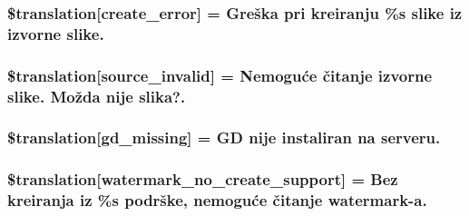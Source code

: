 \subsubsection[{\$translation}]{\setlength{\rightskip}{0pt plus 5cm}\$translation\mbox{[}\textquotesingle{}create\+\_\+error\textquotesingle{}\mbox{]} = \textquotesingle{}Greška pri kreiranju \%s slike iz izvorne slike.\textquotesingle{}}\label{class_8upload_8hr___h_r_8php_a53013ce9255c4e1849098ddd9fdb2b3f}
\hypertarget{class_8upload_8hr___h_r_8php_a6ab0a660b457eaf2d3434b225449fdd6}{}
\subsubsection[{\$translation}]{\setlength{\rightskip}{0pt plus 5cm}\$translation\mbox{[}\textquotesingle{}source\+\_\+invalid\textquotesingle{}\mbox{]} = \textquotesingle{}Nemoguće čitanje izvorne slike. Možda nije slika?.\textquotesingle{}}\label{class_8upload_8hr___h_r_8php_a6ab0a660b457eaf2d3434b225449fdd6}
\hypertarget{class_8upload_8hr___h_r_8php_a7f3dfcc0db4bbc0f2e7210c439798e56}{}
\subsubsection[{\$translation}]{\setlength{\rightskip}{0pt plus 5cm}\$translation\mbox{[}\textquotesingle{}gd\+\_\+missing\textquotesingle{}\mbox{]} = \textquotesingle{}G\+D nije instaliran na serveru.\textquotesingle{}}\label{class_8upload_8hr___h_r_8php_a7f3dfcc0db4bbc0f2e7210c439798e56}
\hypertarget{class_8upload_8hr___h_r_8php_a82d5853430ab72dc1f9799ec36144cc6}{}
\subsubsection[{\$translation}]{\setlength{\rightskip}{0pt plus 5cm}\$translation\mbox{[}\textquotesingle{}watermark\+\_\+no\+\_\+create\+\_\+support\textquotesingle{}\mbox{]} = \textquotesingle{}Bez kreiranja iz \%s podrške, nemoguće čitanje watermark-\/a.\textquotesingle{}}\label{class_8upload_8hr___h_r_8php_a82d5853430ab72dc1f9799ec36144cc6}
\hypertarget{class_8upload_8hr___h_r_8php_aabca0b65dadbc6184415c16375f284ca}{}
